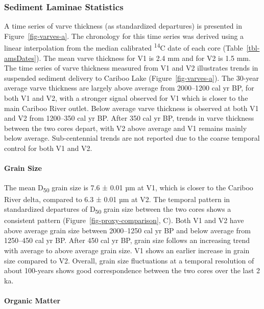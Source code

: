 \documentclass[
  letterpaper,
  DIV=11,
  numbers=noendperiod]{scrartcl}
\let\oldparagraph\paragraph
\renewcommand{\paragraph}[1]{\oldparagraph{#1}\mbox{}}
\begin{document}
\subsubsection{Sediment Laminae
Statistics}\label{sediment-laminae-statistics}

A time series of varve thickness (as standardized departures) is
presented in Figure~\ref{fig-varves-a}. The chronology for this time
series was derived using a linear interpolation from the median
calibrated \textsuperscript{14}C date of each core
(Table~\ref{tbl-amsDates}). The mean varve thickness for V1 is 2.4 mm
and for V2 is 1.5 mm. The time series of varve thickness measured from
V1 and V2 illustrates trends in suspended sediment delivery to Cariboo
Lake (Figure~\ref{fig-varves-a}). The 30-year average varve thickness
are largely above average from 2000--1200 cal yr BP, for both V1 and V2,
with a stronger signal observed for V1 which is closer to the main
Cariboo River outlet. Below average varve thickness is observed at both
V1 and V2 from 1200--350 cal yr BP. After 350 cal yr BP, trends in varve
thickness between the two cores depart, with V2 above average and V1
remains mainly below average. Sub-centennial trends are not reported due
to the coarse temporal control for both V1 and V2.

\paragraph{Grain Size}\label{grain-size}

The mean D\textsubscript{50} grain size is 7.6 ± 0.01 µm at V1, which is
closer to the Cariboo River delta, compared to 6.3 ± 0.01 µm at V2. The
temporal pattern in standardized departures of D\textsubscript{50} grain
size between the two cores shows a consistent pattern
(Figure~\ref{fig-proxy-comparison}, C). Both V1 and V2 have above
average grain size between 2000--1250 cal yr BP and below average from
1250--450 cal yr BP. After 450 cal yr BP, grain size follows an
increasing trend with average to above average grain size. V1 shows an
earlier increase in grain size compared to V2. Overall, grain size
fluctuations at a temporal resolution of about 100-years shows good
correspondence between the two cores over the last 2 ka.

\paragraph{Organic Matter}\label{organic-matter}
\end{document}
